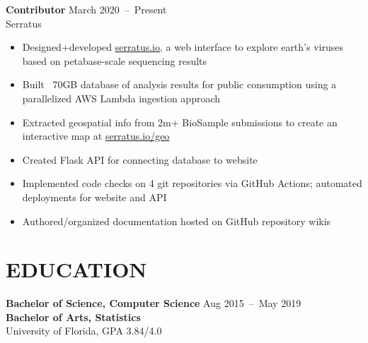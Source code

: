 \documentclass[line,resmargin]{res}
\begin{document}
\begin{resume}
    \textbf{Contributor}    \hfill March 2020~--~Present \\
    Serratus
    \begin{itemize}  \itemsep -2pt
        \item Designed+developed \href{https://serratus.io/}{serratus.io}, a web interface to explore earth's viruses based on petabase-scale sequencing results
        \item Built ~70GB database of analysis results for public consumption using a parallelized AWS Lambda ingestion approach
        \item Extracted geospatial info from 2m+ BioSample submissions to create an interactive map at \href{https://serratus.io/geo}{serratus.io/geo}
        \item Created Flask API for connecting database to website
        \item Implemented code checks on 4 git repositories via GitHub Actions; automated deployments for website and API
        \item Authored/organized documentation hosted on GitHub repository wikis
    \end{itemize}

\section{EDUCATION}
    \textbf{Bachelor of Science, Computer Science}    \hfill Aug 2015~--~May 2019 \\
    \textbf{Bachelor of Arts, Statistics} \\
    University of Florida, GPA 3.84/4.0


\end{resume}
\end{document}
